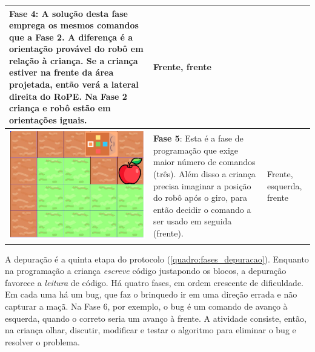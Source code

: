 \begin{quadro}[htbp]
\begin{longtable}{ | m{} | m{} | m{} | }
        \textbf{Fase 4}:
        A solução desta fase emprega os mesmos comandos que a Fase 2. A diferença é a orientação provável do robô em relação à criança. Se a criança estiver na frente da área projetada, então verá a lateral direita do RoPE. Na Fase 2 criança e robô estão em orientações iguais. &

        Frente, frente
        
        \\ \hline
    
    
        \includegraphics[width=.9\linewidth]{figs/prog/5.png} &
    
        \textbf{Fase 5}: 
        Esta é a fase de programação que exige maior número de comandos (três). Além disso a criança precisa imaginar a posição do robô após o giro, para então decidir o comando a ser usado em seguida (frente).
        &
        Frente, esquerda, frente 
        
        \\ \hline
        
    \end{longtable}
\end{quadro}

A depuração é a quinta etapa do protocolo (\autoref{quadro:fases_depuracao}). Enquanto na programação a criança \textit{escreve} código justapondo os blocos, a depuração favorece a \textit{leitura} de código. Há quatro fases, em ordem crescente de dificuldade. Em cada uma há um bug, que faz o brinquedo ir em uma direção errada e não capturar a maçã. Na Fase 6, por exemplo, o bug é um comando de avanço à esquerda, quando o correto seria um avanço à frente. A atividade consiste, então, na criança olhar, discutir, modificar e testar o algoritmo para eliminar o bug e resolver o problema.

